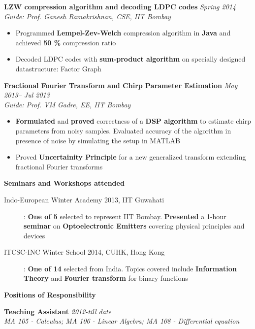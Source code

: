\documentclass[a4paper,10pt]{article}
\newcommand{\resheading}[1]{
	{\large \colorbox{mygrey}{\begin{minipage}{\textwidth}{\textbf{#1 \vphantom{p\^{E}}}}\end{minipage}}}
}
\newcommand{\ressubheadingWithGuide}[3]{%
	\textbf{#1} \hfill \textit{#2}\null\\
	\textit{\small #3} %
	\vspace{-6pt}
}
\begin{document}
			\ressubheadingWithGuide{LZW compression algorithm and decoding LDPC codes}{Spring 2014}{Guide: Prof. Ganesh Ramakrishnan, CSE, IIT Bombay}
            	\begin{itemize}\itemsep -2pt
            		\item Programmed \textbf{Lempel-Zev-Welch} compression algorithm in \textbf{Java} and achieved \textbf{50 \%} compression ratio
					\item Decoded LDPC codes with \textbf{sum-product algorithm} on specially designed datastructure: Factor Graph
            	\end{itemize}
             
        	\ressubheadingWithGuide{Fractional Fourier Transform and Chirp Parameter Estimation}{May 2013-- Jul 2013}{Guide: Prof. VM Gadre, EE, IIT Bombay}
            	\begin{itemize}\itemsep -2pt
                	\item \textbf{Formulated} and \textbf{proved} correctness of a \textbf{DSP algorithm} to estimate chirp parameters from noisy samples. Evaluated accuracy of the algorithm in presence of noise by simulating the setup in MATLAB
					\item Proved \textbf{Uncertainity Principle} for a new generalized transform extending fractional Fourier transforms
				\end{itemize}
		
\resheading{Seminars and Workshops attended}
	\begin{description}  
		\item[Indo-European Winter Academy 2013, IIT Guwahati] : \textbf{One of 5} selected to represent IIT Bombay. \textbf{Presented} a 1-hour \textbf{seminar} on \textbf{Optoelectronic Emitters} covering physical principles and devices
		\item[ITCSC-INC Winter School 2014, CUHK, Hong Kong] : \textbf{One of 14} selected from India. Topics covered include \textbf{Information Theory} and \textbf{Fourier transform} for binary functions
	\end{description}
\resheading{Positions of Responsibility}

			\ressubheadingWithGuide{Teaching Assistant}{2012-till date}{\normalsize \normalfont \hspace{10pt} MA 105 - Calculus;  MA 106 - Linear Algebra; MA 108 - Differential equation}
			
\end{document}
